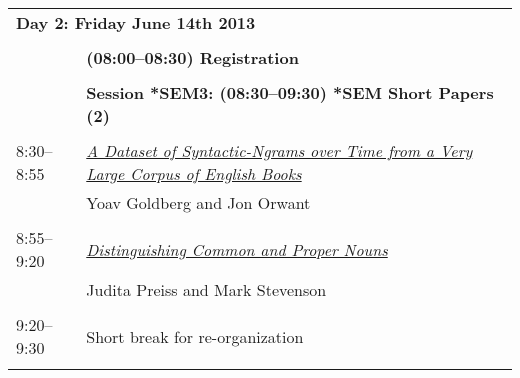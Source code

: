 \begin{tabular}{p{20mm}p{138mm}}
\multicolumn{2}{l}{\bf Day 2: Friday June 14th 2013} \\
\\
 & {\bf (08:00--08:30) Registration} \\
\\
 & {\bf Session *SEM3: (08:30--09:30) *SEM Short Papers (2)} \\
\\
8:30--8:55 & \hyperlink{page.242}{\em A Dataset of Syntactic-Ngrams over Time from a Very Large Corpus of English Books}\\
         & Yoav Goldberg and Jon Orwant \\
\\

8:55--9:20 & \hyperlink{page.249}{\em Distinguishing Common and Proper Nouns}\\
         & Judita Preiss and Mark Stevenson \\
\\

9:20--9:30 & Short break for re-organization \\
\\
\end{tabular}
\newpage
